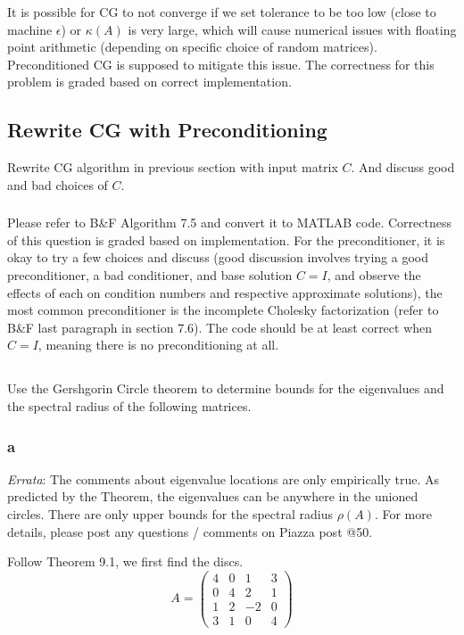 \documentclass[12pt]{article} %
\newcommand{\ka}{\kappa}
\newcommand{\1}[1]{\mathds{1}\left[#1\right]}
\newcommand{\eps}{\epsilon}
\begin{document}
It is possible for CG to not converge if we set tolerance to be too low (close to machine $\eps$) or $\ka(A)$ is very large, which will cause numerical issues with floating point arithmetic (depending on specific choice of random matrices). Preconditioned CG is supposed to mitigate this issue. The correctness for this problem is graded based on correct implementation. 

\subsection{Rewrite CG with Preconditioning}
Rewrite CG algorithm in previous section with input matrix $C$. And discuss good and bad choices of $C$.
\subsubsection{}
Please refer to B\&F Algorithm 7.5 and convert it to MATLAB code. Correctness of this question is graded based on implementation. For the preconditioner, it is okay to try a few choices and discuss (good discussion involves trying a good preconditioner, a bad conditioner, and base solution $C=I$, and observe the effects of each on condition numbers and respective approximate solutions), the most common preconditioner is the incomplete Cholesky factorization (refer to B\&F last paragraph in section 7.6). The code should be at least correct when $C = I$, meaning there is no preconditioning at all.



\subsection{}
Use the Gershgorin Circle theorem to determine bounds for the eigenvalues and the spectral radius of the following matrices.

\subsubsection{a}
\emph{Errata}: The comments about eigenvalue locations are only empirically true. As predicted by the Theorem, the eigenvalues can be anywhere in the unioned circles. There are only upper bounds for the spectral radius $\rho(A)$. For more details, please post any questions / comments on Piazza post @50.




Follow Theorem 9.1, we first find the discs.
$$
A = \begin{pmatrix}
	4 & 0 & 1 & 3\\
	0 & 4 & 2 & 1\\
	1 & 2 & -2 & 0\\
	3 & 1 & 0 & 4
\end{pmatrix}
$$
\end{document}
